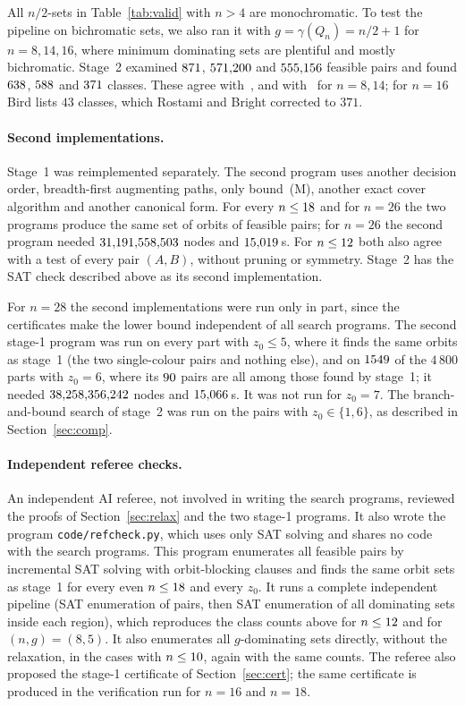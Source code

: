 \documentclass[11pt]{article}
\theoremstyle{definition}
\theoremstyle{remark}
\begin{document}
All $n/2$-sets in Table~\ref{tab:valid} with $n>4$ are monochromatic. To test the pipeline on
bichromatic sets, we also ran it with $g=\gamma(Q_n)=n/2+1$ for $n=8,14,16$, where minimum dominating
sets are plentiful and mostly bichromatic. Stage~2 examined $871$, $571{,}200$ and
$555{,}156$ feasible pairs and found $638$, $588$ and $371$ classes. These
agree with~\cite{RB}, and with~\cite{Bird} for $n=8,14$; for $n=16$ Bird lists $43$ classes, which
Rostami and Bright corrected to $371$.

\paragraph{Second implementations.} Stage~1 was reimplemented separately. The second program uses
another decision order, breadth-first augmenting paths, only bound~(M), another exact cover algorithm
and another canonical form. For every $n\le18$ and for $n=26$ the two programs produce
the same set of orbits of feasible pairs; for $n=26$ the second program needed $31{,}191{,}558{,}503$ nodes and
$15{,}019$\,s. For $n\le12$ both also agree with a test of every pair $(A,B)$, without pruning
or symmetry. Stage~2 has the SAT check described above as its second implementation.

For $n=28$ the second implementations were run only in part, since the certificates make the lower
bound independent of all search programs. The second stage-1 program was run on every part with
$z_0\le5$, where it finds the same orbits as stage~1 (the two single-colour pairs and nothing else), and
on $1549$ of the $4\,800$ parts with $z_0=6$, where its $90$ pairs are all among
those found by stage~1; it needed $38{,}258{,}356{,}242$ nodes and $15{,}066$\,s. It was not run for
$z_0=7$. The branch-and-bound search of stage~2 was run on the pairs with $z_0\in\{1,6\}$, as described in
Section~\ref{sec:comp}.

\paragraph{Independent referee checks.} An independent AI referee, not involved in writing the search
programs, reviewed the proofs of Section~\ref{sec:relax} and the two stage-1 programs. It also wrote
the program \texttt{code/refcheck.py}, which uses only SAT solving and shares no code with the search
programs. This program enumerates all feasible pairs by incremental SAT solving with orbit-blocking clauses and finds the same
orbit sets as stage~1 for every even $n\le18$ and every $z_0$. It runs a complete
independent pipeline (SAT enumeration of pairs, then SAT enumeration of all dominating sets inside each
region), which reproduces the class counts above for $n\le12$ and for $(n,g)=(8,5)$. It also
enumerates all $g$-dominating sets directly, without the relaxation, in the cases with
$n\le10$, again with the same counts. The referee also proposed the stage-1 certificate of
Section~\ref{sec:cert}; the same certificate is produced in the verification run for $n=16$ and $n=18$.
\end{document}
